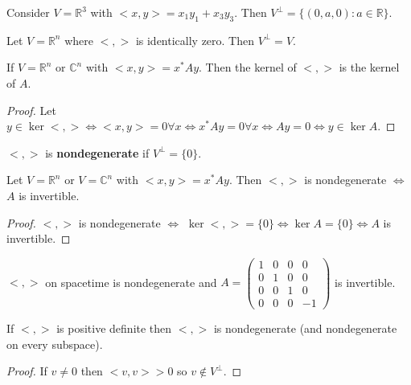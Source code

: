 \documentclass{article}
\newcommand{\vocab}[1]{\textbf{\color{blue!90}\boldmath #1}}
\newcommand{\C}{\mathbb{C}}
\newcommand{\R}{\mathbb{R}}
\begin{document}
\begin{example}
Consider $V=\R^3$ with $<x,y>=x_1y_1+x_3y_3$. Then $V^\perp=\{(0,a,0):a\in \R\}$. 
\end{example}
\begin{example}
Let $V=\R^n$ where $<,>$ is identically zero. Then $V^\perp=V$.
\end{example}
\begin{proposition}
If $V=\R^n$ or $\C^n$ with $<x,y>=x^*Ay$. Then the kernel of $<,>$ is the kernel of $A$.
\end{proposition}
\begin{proof}
Let $y\in\ker<,>\iff<x,y>=0\forall x\iff x^*Ay=0\forall x\iff Ay=0\iff y\in\ker A$. 
\end{proof}
\begin{definition}
$<,>$ is \vocab{nondegenerate} if $V^\perp=\{0\}$. 
\end{definition}
\begin{proposition}
Let $V=\R^n$ or $V=\C^n$ with $<x,y>=x^*Ay$. Then $<,>$ is nondegenerate $\iff$ $A$ is invertible. 
\end{proposition}
\begin{proof}
$<,>$ is nondegenerate $\iff$ $\ker<,>=\{0\}\iff\ker A=\{0\}\iff A$ is invertible. 
\end{proof}
\begin{example}
$<,>$ on spacetime is nondegenerate and $A=\begin{pmatrix}
1&0&0&0\\0&1&0&0\\0&0&1&0\\0&0&0&-1
\end{pmatrix}$ is invertible.
\end{example}
\begin{example}
If $<,>$ is positive definite then $<,>$ is nondegenerate (and nondegenerate on every subspace).
\end{example}
\begin{proof}
If $v\neq0$ then $<v,v>>0$ so $v\notin V^\perp$. 
\end{proof}
\end{document}
